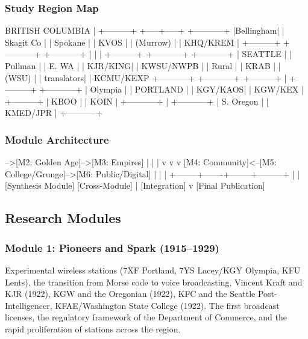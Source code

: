 \documentclass[11pt,letterpaper]{article}
\begin{document}
\subsubsection{Study Region Map}

\begin{asciibox}
                    BRITISH COLUMBIA
                         |
    +---------+    +-----+-----+    +-----------+
    |Bellingham|    | Skagit Co |    | Spokane   |
    | KVOS     |    | (Murrow)  |    | KHQ/KREM  |
    +---------+    +-----------+    +-----------+
         |              |                |
    +---------+    +-----------+    +-----------+
    | SEATTLE |    | Pullman   |    | E. WA     |
    | KJR/KING|    | KWSU/NWPB |    | Rural     |
    | KRAB    |    | (WSU)     |    | translators|
    | KCMU/KEXP    +-----------+    +-----------+
    +---------+
         |
    +---------+    +-----------+
    | Olympia |    | PORTLAND  |
    | KGY/KAOS|    | KGW/KEX  |
    +---------+    | KBOO     |
                   | KOIN     |
                   +-----------+
                        |
                   +-----------+
                   | S. Oregon |
                   | KMED/JPR  |
                   +-----------+
\end{asciibox}

\subsubsection{Module Architecture}

\begin{asciibox}
  [M1: Pioneers]-->[M2: Golden Age]-->[M3: Empires]
       |                |                  |
       v                v                  v
  [M4: Community]<--[M5: College/Grunge]-->[M6: Public/Digital]
       |                |                  |
       +--------+-------+--------+---------+
                |                 |
         [Synthesis Module]  [Cross-Module]
                |            [Integration]
                v
         [Final Publication]
\end{asciibox}

\subsection{Research Modules}

\subsubsection{Module 1: Pioneers and Spark (1915--1929)}
Experimental wireless stations (7XF Portland, 7YS Lacey/KGY Olympia, KFU Lents), the transition from Morse code to voice broadcasting, Vincent Kraft and KJR (1922), KGW and the Oregonian (1922), KFC and the Seattle Post-Intelligencer, KFAE/Washington State College (1922). The first broadcast licenses, the regulatory framework of the Department of Commerce, and the rapid proliferation of stations across the region.
\end{document}
